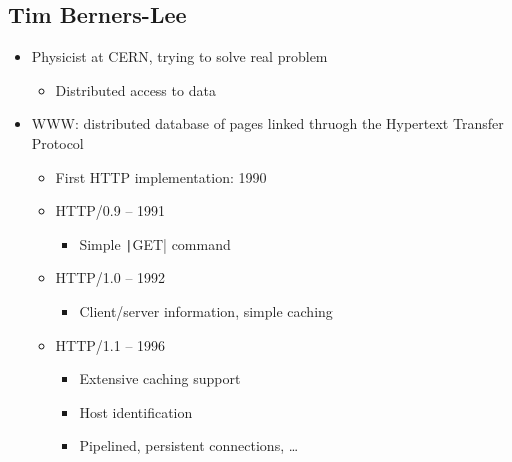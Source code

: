 \subsection{Tim Berners-Lee}
\begin{itemize}[nosep]
    \item Physicist at CERN, trying to solve real problem
          \begin{itemize}[nosep]
              \item Distributed access to data
          \end{itemize}
    \item WWW: distributed database of pages linked thruogh the Hypertext Transfer Protocol
          \begin{itemize}[nosep]
              \item First HTTP implementation: 1990
              \item HTTP/0.9 -- 1991
                    \begin{itemize}[nosep]
                        \item Simple \texttt|GET| command
                    \end{itemize}
              \item HTTP/1.0 -- 1992
                    \begin{itemize}[nosep]
                        \item Client/server information, simple caching
                    \end{itemize}
              \item HTTP/1.1 -- 1996
                    \begin{itemize}[nosep]
                        \item Extensive caching support
                        \item Host identification
                        \item Pipelined, persistent connections, \dots
                    \end{itemize}
          \end{itemize}
\end{itemize}
